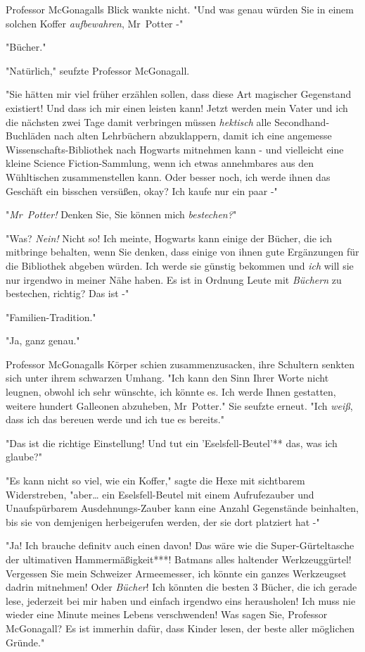 {Professor McGonagalls Blick wankte nicht. "Und was genau würden Sie in einem solchen Koffer \emph{aufbewahren}, Mr~Potter -"

"Bücher."

"Natürlich," seufzte Professor McGonagall.

"Sie hätten mir viel früher erzählen sollen, dass diese Art magischer Gegenstand existiert! Und dass ich mir einen leisten kann! Jetzt werden mein Vater und ich die nächsten zwei Tage damit verbringen müssen \emph{hektisch} alle Secondhand-Buchläden nach alten Lehrbüchern abzuklappern, damit ich eine angemesse Wissenschafts-Bibliothek nach Hogwarts mitnehmen kann - und vielleicht eine kleine Science Fiction-Sammlung, wenn ich etwas annehmbares aus den Wühltischen zusammenstellen kann. Oder besser noch, ich werde ihnen das Geschäft ein bisschen versüßen, okay? Ich kaufe nur ein paar -"

"\emph{Mr~Potter!} Denken Sie, Sie können mich \emph{bestechen?}"

"Was? \emph{Nein!} Nicht so! Ich meinte, Hogwarts kann einige der Bücher, die ich mitbringe behalten, wenn Sie denken, dass einige von ihnen gute Ergänzungen für die Bibliothek abgeben würden. Ich werde sie günstig bekommen und \emph{ich} will sie nur irgendwo in meiner Nähe haben. Es ist in Ordnung Leute mit \emph{Büchern} zu bestechen, richtig? Das ist -"

"Familien-Tradition."

"Ja, ganz genau."

Professor McGonagalls Körper schien zusammenzusacken, ihre Schultern senkten sich unter ihrem schwarzen Umhang. "Ich kann den Sinn Ihrer Worte nicht leugnen, obwohl ich sehr wünschte, ich könnte es. Ich werde Ihnen gestatten, weitere hundert Galleonen abzuheben, Mr~Potter." Sie seufzte erneut. "Ich \emph{weiß}, dass ich das bereuen werde und ich tue es bereits."

"Das ist die richtige Einstellung! Und tut ein 'Eselsfell-Beutel'** das, was ich glaube?"

"Es kann nicht so viel, wie ein Koffer," sagte die Hexe mit sichtbarem Widerstreben, "aber… ein Eselsfell-Beutel mit einem Aufrufezauber und Unaufspürbarem Ausdehnungs-Zauber kann eine Anzahl Gegenstände beinhalten, bis sie von demjenigen herbeigerufen werden, der sie dort platziert hat -"

"Ja! Ich brauche definitv auch einen davon! Das wäre wie die Super-Gürteltasche der ultimativen Hammermäßigkeit***! Batmans alles haltender Werkzeuggürtel! Vergessen Sie mein Schweizer Armeemesser, ich könnte ein ganzes Werkzeugset dadrin mitnehmen! Oder \emph{Bücher}! Ich könnten die besten 3 Bücher, die ich gerade lese, jederzeit bei mir haben und einfach irgendwo eins herausholen! Ich muss nie wieder eine Minute meines Lebens verschwenden! Was sagen Sie, Professor McGonagall? Es ist immerhin dafür, dass Kinder lesen, der beste aller möglichen Gründe."

}
